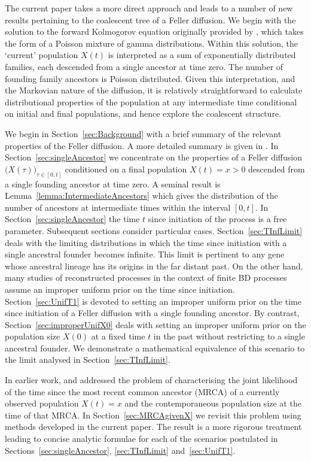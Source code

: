 \documentclass[preprint,12pt]{elsarticle}
\begin{document}
The current paper takes a more direct approach and leads to a number of new results pertaining to the coalescent tree of a Feller diffusion.  
We begin with the solution to the forward Kolmogorov equation originally provided by \citet[Eq.~5.2]{feller1951diffusion}, 
which takes the form of a Poisson mixture of gamma distributions.  Within this solution, the `current' population $X(t)$ is interpreted as a sum of exponentially distributed 
families, each descended from a single ancestor at time zero. The number of founding family ancestors is Poisson distributed. Given this interpretation, and the Markovian 
nature of the diffusion, it is relatively straightforward to calculate distributional properties of the population at any intermediate time conditional on initial and 
final populations, and hence explore the coalescent structure.  

We begin in Section~\ref{sec:Background} with a brief summary of the relevant properties of the Feller diffusion.  A more detailed summary is given in 
\cite{BurdenGriffiths24}.  In Section~\ref{sec:singleAncestor} we concentrate on the properties of a Feller diffusion $\big(X(\tau)\big)_{\tau \in [0, t]}$ conditioned 
on a final population $X(t) = x > 0$ descended from a single founding ancestor at time zero.  A seminal result is Lemma~\ref{lemma:IntermediateAncestors} which 
gives the distribution of the number of ancestors at intermediate times within the interval $[0, t]$.  
In Section~\ref{sec:singleAncestor} the time $t$ since initiation of the process is a free parameter.  Subsequent 
sections consider particular cases.  Section~\ref{sec:TInfLimit} deals with the limiting distributions in which the time since initiation with a single ancestral founder 
becomes infinite.  This limit is pertinent to any gene whose ancestral lineage has its origins in the far distant past.  On the other hand, many studies of reconstructed 
processes in the context of finite BD processes assume an improper uniform prior on the time since initiation. Section~\ref{sec:UnifT1} is devoted to setting an 
improper uniform prior on the time since initiation of a Feller diffusion with a single founding ancestor.  By contrast, Section~\ref{sec:improperUnifX0} deals with 
setting an improper uniform prior on the population size $X(0)$ at a fixed time $t$ in the past without restricting to a single ancestral founder.  We demonstrate a 
mathematical equivalence of this scenario to the limit analysed in Section~\ref{sec:TInfLimit}.  

In earlier work, \citet{burden2016genetic} and \citet{BurdenSoewongsoso19} addressed the problem of characterising the joint likelihood of the time since the 
most recent common ancestor (MRCA) of a currently observed population $X(t) = x$ and the contemporaneous population size at the time of that MRCA.  
In Section~\ref{sec:MRCAgivenX} we revisit this problem using methods developed in the current paper.  The result is a more rigorous treatment leading to 
concise analytic formulae for each of the scenarios postulated in Sections~\ref{sec:singleAncestor}, \ref{sec:TInfLimit} and~\ref{sec:UnifT1}.  
\end{document}
